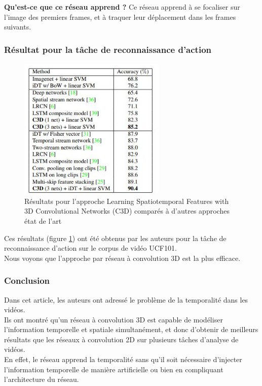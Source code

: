 \documentclass[11pt]{article}
\begin{document}
\textbf{Qu'est-ce que ce réseau apprend ?} Ce réseau apprend à se focaliser sur l'image des premiers frames, et à traquer leur déplacement dans les frames suivants.\\

\subsubsection{Résultat pour la tâche de reconnaissance d'action}
\label{sec:org70971af}
\begin{figure}[htbp]
\centering
\includegraphics[width=7cm]{c3d_result.jpg}
\caption{Résultats pour l'approche Learning Spatiotemporal Features with 3D Convolutional Networks (C3D) comparés à d'autres approches état de l'art \label{c3d-res}}
\end{figure}
Ces résultats (figure \ref{c3d-res}) ont été obtenus par les auteurs pour la tâche de reconnaissance d'action sur le corpus de vidéo UCF101.\\
Nous voyons que l'approche par réseau à convolution 3D est la plus efficace.\\

\subsubsection{Conclusion}
\label{sec:orgae137e1}
Dans cet article, les auteurs ont adressé le problème de la temporalité dans les vidéos.\\
Ils ont montré qu'un réseau à convolution 3D est capable de modéliser l'information temporelle et spatiale simultanément, et donc d'obtenir de meilleurs résultats que les réseaux à convolution 2D sur plusieurs tâches d'analyse de vidéos.\\
En effet, le réseau apprend la temporalité sans qu'il soit nécessaire d'injecter l'information temporelle de manière artificielle ou bien en compliquant l'architecture du réseau.\\
\end{document}
